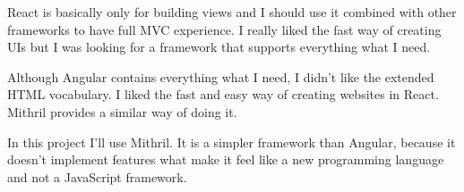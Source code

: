 React is basically only for building views and I should use it combined with other frameworks to have full MVC experience. I really liked the fast way of creating UIs but I was looking for a framework that supports everything what I need. 

Although Angular contains everything what I need, I didn't like the extended HTML vocabulary. I liked the fast and easy way of creating websites in React. Mithril provides a similar way of doing it. 

In this project I'll use Mithril. It is a simpler framework than Angular, because it doesn't implement features what make it feel like a new programming language and not a JavaScript framework.

